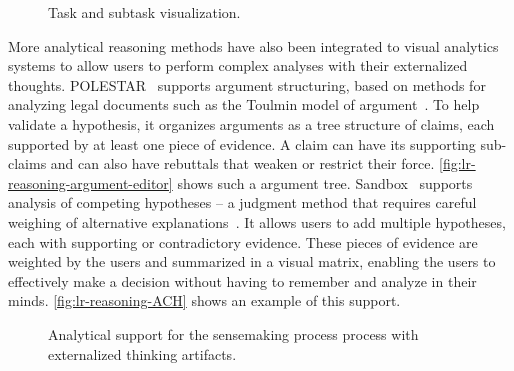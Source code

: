 \begin{figure}[!htb]
\centering
{}
\hfill
{}
\caption{Task and subtask visualization.}
\end{figure}

More analytical reasoning methods have also been integrated to visual analytics systems to allow users to perform complex analyses with their externalized thoughts. POLESTAR~\cite{Pioch2006} supports argument structuring, based on methods for analyzing legal documents such as the Toulmin model of argument~\cite{Toulmin2003}. To help validate a hypothesis, it organizes arguments as a tree structure of claims, each supported by at least one piece of evidence. A claim can have its supporting sub-claims and can also have rebuttals that weaken or restrict their force. \autoref{fig:lr-reasoning-argument-editor} shows such a argument tree. Sandbox~\cite{Wright2006} supports analysis of competing hypotheses -- a judgment method that requires careful weighing of alternative explanations~\cite{Heuer1999}. It allows users to add multiple hypotheses, each with supporting or contradictory evidence. These pieces of evidence are weighted by the users and summarized in a visual matrix, enabling the users to effectively make a decision without having to remember and analyze in their minds. \autoref{fig:lr-reasoning-ACH} shows an example of this support.

\begin{figure}[!htb]
\centering
{}
\hfill
{}
\caption{Analytical support for the sensemaking process process with externalized thinking artifacts.}
\label{fig:lr-reasoning}
\end{figure}

